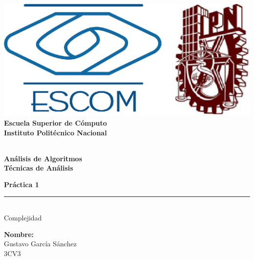 
\begin{titlepage} %

    \begin{flushright}

	   \includegraphics[scale=0.15]{img/escom-ipn.png}
	   \large \textbf{\\Escuela Superior de C\'omputo}
	   \large \textbf{\\Instituto Polit\'ecnico Nacional }%

	   \vspace{2.5cm} %

	   \large \textbf{\\Análisis de Algoritmos}%
	   \large \textbf{\\Técnicas de Análisis}%

	   \vspace{1.2cm} %

	   \large \textbf{Práctica 1}\\%
	   \rule{6cm}{3pt} %
	   \large{\\ Complejidad} %

	   \vspace{2.5cm} %

	   \textbf{Nombre:}	   \\
	   Gustavo García Sánchez \\ %
	   3CV3 %

	   \vspace{2.5cm} %

	   \date{\today}

    \end{flushright}

\end{titlepage}
